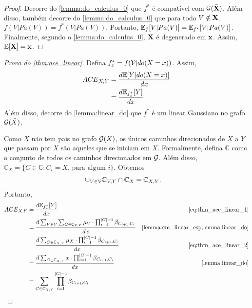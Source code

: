 \begin{proof}
 Decorre do \cref{lemma:do_calculus_0} que
 $f^*$ é compatível com ${\mathcal G}(\bar{{\mathbf{X}}})$.
 Além disso, também 
 decorre do \cref{lemma:do_calculus_0} que
 para todo $V \notin {\mathbf{X}}$,
 $f(V|Pa(V)) = f^*(V|Pa(V))$. Portanto,
 ${\mathbb E}_f[V|Pa(V)] = {\mathbb E}_{f^{*}}[V|Pa(V)]$.
 Finalmente, segundo o \cref{lemma:do_calculus_0},
 ${\mathbf{X}}$ é degenerado em ${\mathbf{x}}$. 
 Assim, ${\mathbb E}[{\mathbf{X}}] = {\mathbf{x}}$.
\end{proof}

\begin{proof}[Prova do \cref{thm:ace_linear}]
 Defina $f^*_x = f({\mathcal V}|do(X=x))$. Assim,
 \begin{align}
  \label{eq:thm_ace_linear_1}
  {ACE}_{X,Y}
  &= \frac{d{\mathbb E}[Y|do(X=x)]}{dx} 
  \nonumber \\
  &= \frac{d{\mathbb E}_{f^*_x}[Y]}{dx}
 \end{align}
 Além disso, decorre do \cref{lemma:linear_do} que
 $f^*$ é um \CM linear Gaussiano
 no grafo ${\mathcal G}(\bar{X})$.
 
 Como $X$ não tem pais no grafo ${\mathcal G}(\bar{X})$,
 os únicos caminhos direcionados de $X$ a $Y$ que 
 passam por $X$ são aqueles que se iniciam em $X$.
 Formalmente, defina $\mathbb{C}$ como o conjunto de 
 todos os caminhos direcionados em ${\mathcal G}$.
 Além disso, $\mathbb{C}_{X} = 
 \{C \in \mathbb{C}: C_i = X \text{, para algum } i\}$. 
 Obtemos
 \begin{align}
  \label{eq:thm_ace_linear_2}
  \cup_{V \in {\mathcal V}} \mathbb{C}_{V,Y} \cap \mathbb{C}_X 
  &= \mathbb{C}_{X,Y}.
 \end{align}
 Portanto,
 \begin{align*}
  \ACE_{X,Y}
  &= \frac{d\E_{f^*_x}[Y]}{dx}
  & \text{\cref{eq:thm_ace_linear_1}} \\
  &= \frac{d \sum_{V \in \mathbb{\sV}} 
  \sum_{C \in \mathbb{C}_{V,Y}}
  \mu_V \cdot \prod_{i=1}^{|C|-1} \beta_{C_{i+1},C_i}}{dx}
  & \text{\cref{lemma:cm_linear_esp,lemma:linear_do}} \\
  &= \frac{d \sum_{C \in \mathbb{C}_{X,Y}}
  \mu_X \cdot \prod_{i=1}^{|C|-1} \beta_{C_{i+1},C_i}}{dx}
  & \text{\cref{eq:thm_ace_linear_2}} \\
  &= \frac{d \sum_{C \in \mathbb{C}_{X,Y}}
  x \cdot \prod_{i=1}^{|C|-1} \beta_{C_{i+1},C_i}}{dx}
  & \text{\cref{lemma:linear_do}} \\
  &= \sum_{C \in \mathbb{C}_{X,Y}} \prod_{i=1}^{|C|-1} \beta_{C_{i+1},C_i}
 \end{align*}
\end{proof}

